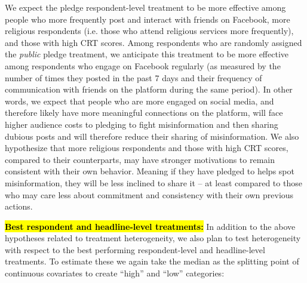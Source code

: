\documentclass[letterpaper, 12pt, parskip=full,]{scrartcl}
\begin{document}
We expect the pledge respondent-level treatment to be more effective among people who more frequently post and interact with friends on Facebook, more religious respondents (i.e. those who attend religious services more frequently), and those with high CRT scores. Among respondents who are randomly assigned the \textit{public} pledge treatment, we anticipate this treatment to be more effective among respondents who engage on Facebook regularly (as measured by the number of times they posted in the past 7 days and their frequency of communication with friends on the platform during the same period). In other words, we expect that people who are more engaged on social media, and therefore likely have more meaningful connections on the platform, will face higher audience costs to pledging to fight misinformation and then sharing dubious posts and will therefore reduce their sharing of misinformation. We also hypothesize that more religious respondents and those with high CRT scores, compared to their counterparts, may have stronger motivations to remain consistent with their own behavior. Meaning if they have pledged to helps spot misinformation, they will be less inclined to share it -- at least compared to those who may care less about commitment and consistency with their own previous actions.








\hl{\textbf{Best respondent and headline-level treatments:}} In addition to the above hypotheses related to treatment heterogeneity, we also plan to test heterogeneity with respect to the best performing respondent-level and headline-level treatments. To estimate these we again take the median as the splitting point of continuous covariates to create ``high'' and ``low'' categories: 
\end{document}
